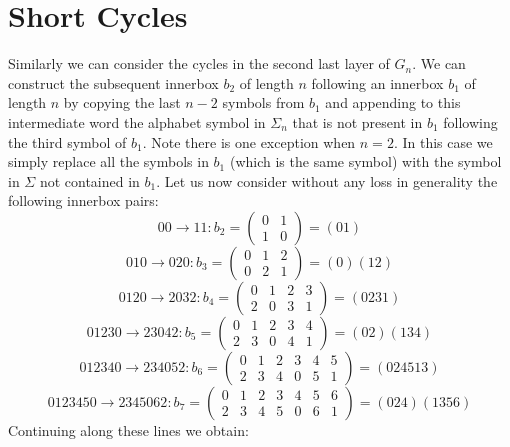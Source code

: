 \documentclass[a4paper,10pt]{article}
\begin{document}
\section{Short Cycles}
Similarly we can consider the cycles in the second last layer of $G_n$. We can construct the subsequent innerbox $b_2$ of length $n$ following an innerbox $b_1$ of length $n$ by copying the last $n-2$ symbols from $b_1$ and appending to this intermediate word the alphabet symbol in $\Sigma_n$ that is not present in $b_1$ following the third symbol of $b_1$. Note there is one exception when $n=2$. In this case we simply replace all the symbols in $b_1$ (which is the same symbol) with the symbol in $\Sigma$ not contained in $b_1$. Let us now consider without any loss in generality the following innerbox pairs:
\begin{equation}
00\rightarrow11:b_2=
\begin{pmatrix}
0&1\\
1&0
\end{pmatrix} = (01)
\end{equation}
\begin{equation}
010\rightarrow020:b_3=
\begin{pmatrix}
0&1&2\\
0&2&1
\end{pmatrix} = (0)(12)
\end{equation}
\begin{equation}
0120\rightarrow2032:b_4=
\begin{pmatrix}
0&1&2&3\\
2&0&3&1
\end{pmatrix} = (0231)
\end{equation}
\begin{equation}
01230\rightarrow23042:b_5=
\begin{pmatrix}
0&1&2&3&4\\
2&3&0&4&1
\end{pmatrix} = (02)(134)
\end{equation}
\begin{equation}
012340\rightarrow234052:b_6=
\begin{pmatrix}
0&1&2&3&4&5\\
2&3&4&0&5&1
\end{pmatrix} = (024513)
\end{equation}
\begin{equation}
0123450\rightarrow2345062:b_7=
\begin{pmatrix}
0&1&2&3&4&5&6\\
2&3&4&5&0&6&1
\end{pmatrix} = (024)(1356)
\end{equation}
Continuing along these lines we obtain:
\end{document}
